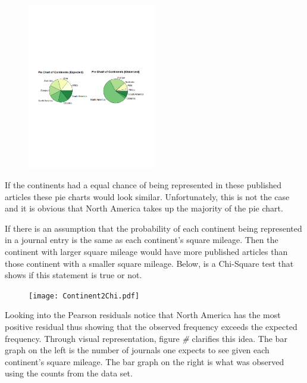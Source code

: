 \documentclass[
]{article}
\begin{document}
\begin{figure}
    \centering
    \includegraphics[width=0.50\textwidth]{ContinentPieChart.pdf}
    \label{fig:Continent Pie Chart}
\end{figure}

If the continents had a equal chance of being represented in these
published articles these pie charts would look similar. Unfortunately,
this is not the case and it is obvious that North America takes up the
majority of the pie chart.

If there is an assumption that the probability of each continent being
represented in a journal entry is the same as each continent's square
mileage. Then the continent with larger square mileage would have more
published articles than those continent with a smaller square mileage.
Below, is a Chi-Square test that shows if this statement is true or not.

\begin{figure}
    \centering
    \texttt{[image: Continent2Chi.pdf]}
    \label{fig:Continent Chi-Square}
\end{figure}

Looking into the Pearson residuals notice that North America has the
most positive residual thus showing that the observed frequency exceeds
the expected frequency. Through visual representation, figure \emph{\#}
clarifies this idea. The bar graph on the left is the number of journals
one expects to see given each continent's square mileage. The bar graph
on the right is what was observed using the counts from the data set.
\end{document}
